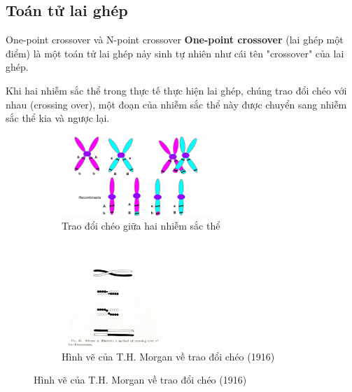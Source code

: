 
\subsection{Toán tử lai ghép} %
\label{sub:Toán tử lai ghép}

\begin{frame}{One-point crossover và N-point crossover}
  \textbf{One-point crossover} (lai ghép một điểm) là một toán tử lai ghép nảy
  sinh tự nhiên như cái tên "crossover" của lai ghép.

  Khi hai nhiễm sắc thể trong thực tế thực hiện lai ghép, chúng trao đổi chéo
  với nhau (crossing over), một đoạn của nhiễm sắc thể này được chuyển sang
  nhiễm sắc thể kia và ngược lại.

\begin{figure}[t!]
    \centering
    \begin{subfigure}[t]{0.5\textwidth}
        \centering
        \includegraphics[height=1.2in]{res/chromosomal.png}
        \caption{Trao đổi chéo giữa hai nhiễm sắc thể}
    \end{subfigure}%
    ~ 
    \begin{subfigure}[t]{0.5\textwidth}
        \centering
        \includegraphics[height=1.2in]{res/crossover_morgan.jpg}
        \caption{Hình vẽ của T.H. Morgan về trao đổi chéo (1916)}
    \end{subfigure}
\end{figure}
\end{frame}

